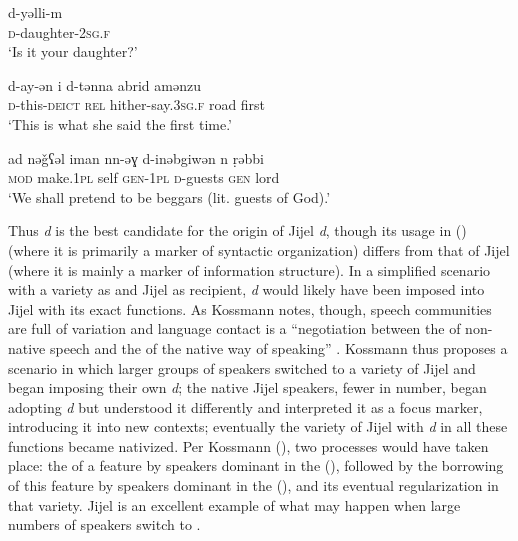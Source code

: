 \documentclass[output=paper]{langsci/langscibook}
\begin{document}
\gll d-yǝlli-m\\
     \textsc{d}-daughter-\textsc{2sg.f}\\
\glt ‘Is it your daughter?’
\z

\ea\label{Berber cleft}

\gll d-ay-ǝn  i  d-tǝnna  abrid  amǝnzu\\
     \textsc{d}-this-\textsc{deict}  \textsc{rel}  hither-say.\textsc{3sg.f}  road  first\\
\glt ‘This is what she said the first time.’
\z

\ea\label{Berber secondary}

\gll ad  nǝǧʕǝl  iman  nn-ǝɣ  d-inǝbgiwǝn  n  ṛǝbbi\\
     \textsc{mod} make.\textsc{1pl} self \textsc{gen-1pl}  \textsc{d}-guests \textsc{gen}  lord\\
\glt ‘We shall pretend to be beggars (lit. guests of God).’
\z

Thus  \textit{d} is the best candidate for the origin of Jijel  \textit{d}, though its usage in ()  (where it is primarily a marker of syntactic organization) differs from that of Jijel  (where it is mainly a marker of information structure). In a simplified scenario with a  variety as  and Jijel  as recipient, \textit{d} would likely have been imposed into Jijel  with its exact  functions. As Kossmann notes, though, speech communities are full of variation and language contact is a “negotiation between the  of non-native speech and the  of the native way of speaking” \citep[138]{Kossmann2014}. Kossmann thus proposes a scenario in which larger groups of  speakers switched to a variety of Jijel  and began imposing their own \textit{d}; the native Jijel  speakers, fewer in number, began adopting \textit{d} but understood it differently and interpreted it as a focus marker, introducing it into new contexts; eventually the variety of Jijel  with \textit{d} in all these functions became nativized. Per Kossmann (\citeyear[138]{Kossmann2014}), two processes would have taken place: the  of a  feature by speakers dominant in the  (), followed by the borrowing of this feature by speakers dominant in the  (), and its eventual regularization in that variety. Jijel  is an excellent example of what may happen when large numbers of  speakers switch to .
\end{document}
